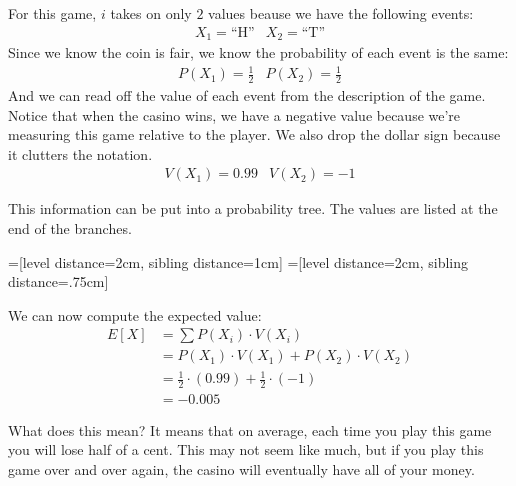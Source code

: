 \documentclass{ximera}
\begin{document}
For this game, $i$ takes on only $2$ values beause we have the following events:
\[ \begin{array}{cc}
      X_1 = \text{``H''} & X_2 = \text{``T''} 
\end{array} \]
Since we know the coin is fair, we know the probability of each event is the same:
\[ \begin{array}{cc}
      P(X_1) = \frac{1}{2} & P(X_2) = \frac{1}{2}
\end{array} \]
And we can read off the value of each event from the description of the game. Notice that when the casino wins, we have a negative value because we're measuring this game relative to the player. We also drop the dollar sign because it clutters the notation.
\[ \begin{array}{cc}
      V(X_1) = 0.99 & V(X_2) = -1
\end{array} \]

This information can be put into a probability tree. The values are listed at the end of the branches.

\begin{center}

=[level distance=2cm, sibling distance=1cm]
=[level distance=2cm, sibling distance=.75cm]

\end{center}

We can now compute the expected value:
\begin{align*}
  E[X] & = \sum P(X_i) \cdot V(X_i) \\
    & = P(X_1) \cdot V(X_1) + P(X_2) \cdot V(X_2) \\
    & = \frac{1}{2} \cdot (0.99) + \frac{1}{2} \cdot (-1) \\
    & = -0.005
\end{align*}

What does this mean? It means that on average, each time you play this game you will lose half of a cent. This may not seem like much, but if you play this game over and over again, the casino will eventually have all of your money.
\end{document}
